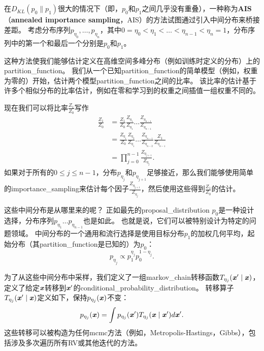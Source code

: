 \subsection{}
\label{sec:annealed_importance_sampling}
在$D_{KL}(p_0 \| p_1)$很大的情况下（即，$p_0$和$p_1$之间几乎没有重叠），一种称为\textbf{\gls{AIS}}（\textbf{annealed importance sampling}，AIS）的方法试图通过引入中间分布来桥接差距\citep{Jarzynski1997,Neal-2001}。
考虑分布序列$p_{\eta_0},\dots,p_{\eta_n}$，其中$0=\eta_0 < \eta_1 < \dots < \eta_{n-1} < \eta_n = 1$，分布序列中的第一个和最后一个分别是$p_0$和$p_1$。


这种方法使我们能够估计定义在高维空间多峰分布（例如训练时定义的分布）上的\gls{partition_function}。
我们从一个已知\gls{partition_function}的简单模型（例如，权重为零的）开始，估计两个模型\gls{partition_function}之间的比率。
该比率的估计基于许多个相似分布的比率估计，例如在零和学习到的权重之间插值一组权重不同的。


现在我们可以将比率$\frac{Z_1}{Z_0}$写作
\begin{align}
\frac{Z_1}{Z_0} &= \frac{Z_1}{Z_0} \frac{Z_{\eta_1}}{Z_{\eta_1}} \dots \frac{Z_{\eta_{n-1}}}{Z_{\eta_{n-1}}} \\
&= \frac{Z_{\eta_1}}{Z_{0}}  \frac{Z_{\eta_2}}{Z_{\eta_1}}  \dots \frac{Z_{\eta_{n-1}}}{Z_{\eta_{n-2}}} \frac{Z_{1}}{Z_{\eta_{n-1}}} \\
&= \prod_{j=0}^{n-1} \frac{ Z_{\eta_{j+1}} }{Z_{\eta_j}}. \label{eq:18.49}
\end{align}
如果对于所有的$0 \leq j \leq n-1$，分布$p_{\eta_j}$和$p_{\eta_{j+1}}$足够接近，那么我们能够使用简单的\gls{importance_sampling}来估计每个因子$\frac{Z_{\eta_{j+1}}}{ Z_{\eta_j}}$，然后使用这些得到$\frac{Z_1}{Z_0}$的估计。


这些中间分布是从哪里来的呢？
正如最先的\gls{proposal_distribution} $p_0$是一种设计选择，分布序列$p_{\eta_1} \dots p_{\eta_{n-1}}$也是如此。
也就是说，它们可以被特别设计为特定的问题领域。
中间分布的一个通用和流行选择是使用目标分布$p_1$的加权几何平均，起始分布（其\gls{partition_function}是已知的）为$p_0$：
\begin{equation}
	p_{\eta_j} \propto p_1^{\eta_j} p_0^{1-\eta_j}.
\end{equation}


为了从这些中间分布中采样，我们定义了一组\gls{markov_chain}转移函数$T_{\eta_j}(\boldsymbol{\mathit{x}}' \mid \boldsymbol{\mathit{x}})$，定义了给定$\boldsymbol{\mathit{x}}$转移到$\boldsymbol{\mathit{x}}'$的\gls{conditional_probability_distribution}。
转移算子$T_{\eta_j}(\boldsymbol{\mathit{x}}' \mid \boldsymbol{\mathit{x}})$定义如下，保持$p_{\eta_j}(\boldsymbol{\mathit{x}})$不变：
\begin{equation}
	p_{\eta_j}(\boldsymbol{\mathit{x}}) = \int p_{\eta_j} (\boldsymbol{\mathit{x}}') T_{\eta_j} (\boldsymbol{\mathit{x}} \mid \boldsymbol{\mathit{x}}') d\boldsymbol{\mathit{x}}'.
\end{equation}
这些转移可以被构造为任何\gls{mcmc}方法（例如，Metropolis-Hastings，Gibbs），包括涉及多次遍历所有\gls{RV}或其他迭代的方法。


